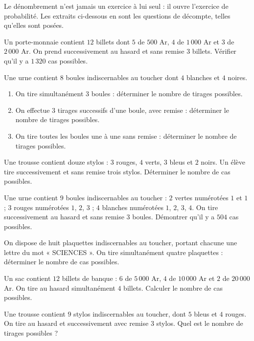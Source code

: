 \begin{annales}
Le dénombrement n'est jamais un exercice à lui seul : il ouvre l'exercice de
probabilité. Les extraits ci-dessous en sont les questions de décompte,
telles qu'elles sont posées.

Un porte-monnaie contient $12$ billets dont $5$ de $500$ Ar, $4$ de
$1\,000$ Ar et $3$ de $2\,000$ Ar. On prend successivement au hasard et sans
remise $3$ billets. Vérifier qu'il y a $1\,320$ cas possibles.

Une urne contient $8$ boules indiscernables au toucher dont $4$ blanches et
$4$ noires.
\begin{enumerate}[label=\textbf{\alph*)}, leftmargin=*, itemsep=0.15em]
  \item On tire simultanément $3$ boules : déterminer le nombre de tirages
        possibles.
  \item On effectue $3$ tirages successifs d'une boule, avec remise :
        déterminer le nombre de tirages possibles.
  \item On tire toutes les boules une à une sans remise : déterminer le
        nombre de tirages possibles.
\end{enumerate}

Une trousse contient douze stylos : $3$ rouges, $4$ verts, $3$ bleus et $2$
noirs. Un élève tire successivement et sans remise trois stylos.
Déterminer le nombre de cas possibles.

Une urne contient $9$ boules indiscernables au toucher : $2$ vertes
numérotées $1$ et $1$ ; $3$ rouges numérotées $1$, $2$, $3$ ; $4$ blanches
numérotées $1$, $2$, $3$, $4$. On tire successivement au hasard et sans
remise $3$ boules. Démontrer qu'il y a $504$ cas possibles.

On dispose de huit plaquettes indiscernables au toucher, portant chacune une
lettre du mot « SCIENCES ». On tire simultanément quatre plaquettes :
déterminer le nombre de cas possibles.

Un sac contient $12$ billets de banque : $6$ de $5\,000$ Ar, $4$ de
$10\,000$ Ar et $2$ de $20\,000$ Ar. On tire au hasard simultanément
$4$ billets. Calculer le nombre de cas possibles.

Une trousse contient $9$ stylos indiscernables au toucher, dont $5$ bleus et
$4$ rouges. On tire au hasard et successivement avec remise $3$ stylos.
Quel est le nombre de tirages possibles ?
\end{annales}

